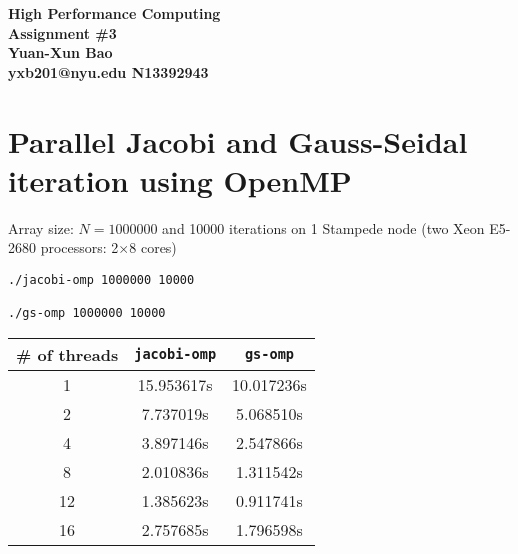 \documentclass[12pt]{article}
\begin{document}
\begin{center}

\large \textbf{%
High Performance Computing \\ Assignment \#3 \\ Yuan-Xun Bao \\ yxb201@nyu.edu \quad N13392943}
\end{center}

\section{Parallel Jacobi and Gauss-Seidal iteration using OpenMP}

Array size: $N = 1000000$ and 10000 iterations on 1 Stampede node (two Xeon E5-2680 processors: 2$\times$8 cores)
\begin{verbatim}
./jacobi-omp 1000000 10000

./gs-omp 1000000 10000 
\end{verbatim}

\begin{center}
  \begin{tabular}{ | c | c | c |}
    \hline
    \# of threads & \verb|jacobi-omp| & \verb|gs-omp| \\ \hline
    1  & 15.953617s  &  10.017236s \\ \hline
    2  & 7.737019s & 5.068510s \\ \hline
    4  & 3.897146s & 2.547866s \\ \hline
    8 & 2.010836s & 1.311542s \\ \hline
    12 & 1.385623s & 0.911741s \\ \hline
    16 & 2.757685s & 1.796598s \\ 
     \hline
  \end{tabular}
\end{center}
\end{document}
